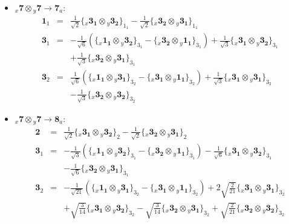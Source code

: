 \documentclass[english]{article}
\newcommand{\rep}[1]{\mathbf{#1}}
\newcommand{\repx}[2]{{}_{#2}\mathbf{#1}}
\newcommand{\subcg}[3]{\big\{ \repx{#1}{x}\otimes\repx{#2}{y}\big\}^{}_{#3}}
\begin{document}
\begin{itemize}
\item $\repx{7}{x}\otimes\repx{7}{y}\to\rep{7}_{a}$:
\begin{eqnarray*}
\rep{1}_{1} &=& \frac{1}{\sqrt{2}}\subcg{3_{1}}{3_{2}}{1_{1}}-\frac{1}{\sqrt{2}}\subcg{3_{2}}{3_{1}}{1_{1}}
\\
\rep{3}_{1} &=& -\frac{1}{\sqrt{6}}\left(\subcg{1_{1}}{3_{2}}{3_{1}}-\subcg{3_{2}}{1_{1}}{3_{1}}\right)+\frac{1}{\sqrt{3}}\subcg{3_{1}}{3_{2}}{3_{1}} \\ 
 & & +\frac{1}{\sqrt{3}}\subcg{3_{2}}{3_{1}}{3_{1}}
\\
\rep{3}_{2} &=& \frac{1}{\sqrt{6}}\left(\subcg{1_{1}}{3_{1}}{3_{2}}-\subcg{3_{1}}{1_{1}}{3_{2}}\right)+\frac{1}{\sqrt{3}}\subcg{3_{1}}{3_{1}}{3_{2}} \\ 
 & & -\frac{1}{\sqrt{3}}\subcg{3_{2}}{3_{2}}{3_{2}}
\end{eqnarray*}
\item $\repx{7}{x}\otimes\repx{7}{y}\to\rep{8}_{a}$:
\begin{eqnarray*}
\rep{2} &=& \frac{1}{\sqrt{2}}\subcg{3_{1}}{3_{2}}{2}-\frac{1}{\sqrt{2}}\subcg{3_{2}}{3_{1}}{2}
\\
\rep{3}_{1} &=& -\frac{1}{\sqrt{3}}\left(\subcg{1_{1}}{3_{2}}{3_{1}}-\subcg{3_{2}}{1_{1}}{3_{1}}\right)-\frac{1}{\sqrt{6}}\subcg{3_{1}}{3_{2}}{3_{1}} \\ 
 & & -\frac{1}{\sqrt{6}}\subcg{3_{2}}{3_{1}}{3_{1}}
\\
\rep{3}_{2} &=& -\frac{1}{\sqrt{21}}\left(\subcg{1_{1}}{3_{1}}{3_{2}}-\subcg{3_{1}}{1_{1}}{3_{2}}\right)+2 \sqrt{\frac{2}{21}}\subcg{3_{1}}{3_{1}}{3_{2}} \\ 
 & & +\sqrt{\frac{3}{14}}\subcg{3_{1}}{3_{2}}{3_{2}}-\sqrt{\frac{3}{14}}\subcg{3_{2}}{3_{1}}{3_{2}}+\sqrt{\frac{2}{21}}\subcg{3_{2}}{3_{2}}{3_{2}}
\end{eqnarray*}
\end{itemize}
\end{document}

